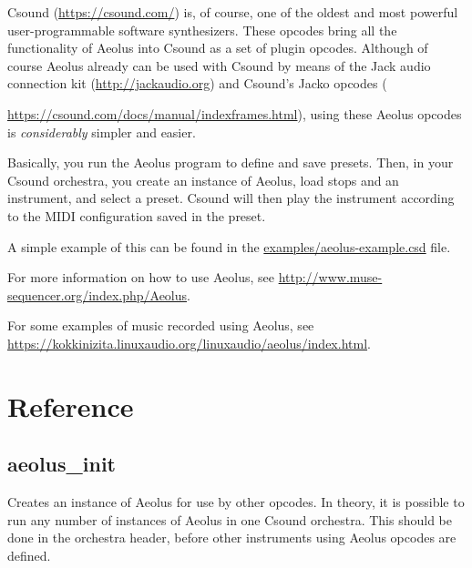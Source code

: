 \documentclass[english,11pt,letterpaper,onecolumn]{scrartcl}
\begin{document}
Csound (\url{https://csound.com/}) is, of course, one of the oldest and most powerful user-programmable software synthesizers. These opcodes bring all the functionality of Aeolus into Csound as a set of plugin opcodes. Although of course Aeolus already can be used with Csound by means of the Jack audio connection kit (\url{http://jackaudio.org}) and Csound's Jacko opcodes ({\url{https://csound.com/docs/manual/indexframes.html}), using these Aeolus opcodes is \textit{considerably} simpler and easier. 

Basically, you run the Aeolus program to define and save presets. Then, in your Csound orchestra, you create an instance of Aeolus, load stops and an instrument, and select a preset. Csound will then play the instrument according to the MIDI configuration saved in the preset.

A simple example of this can be found in the \url{examples/aeolus-example.csd} file.

For more information on how to use Aeolus, see \url{http://www.muse-sequencer.org/index.php/Aeolus}.

For some examples of music recorded using Aeolus, see \url{https://kokkinizita.linuxaudio.org/linuxaudio/aeolus/index.html}.

\section{Reference}

\subsection*{aeolus\_init}

Creates an instance of Aeolus for use by other opcodes. In theory, it is possible to run any number of instances of Aeolus in one Csound orchestra. This should be done in the orchestra header, before other instruments using Aeolus opcodes are defined.

}
\end{document}
